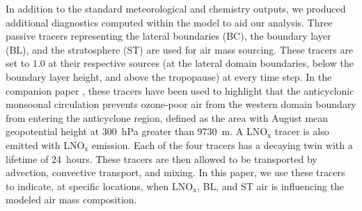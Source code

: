 In addition to the standard meteorological and chemistry outputs, we produced additional
diagnostics computed within the model to aid our analysis.
Three passive tracers representing the lateral boundaries (BC), the boundary layer (BL), and the
stratosphere (ST) are used for air mass sourcing. These tracers are set to $1.0$ at their respective
sources (at the lateral domain boundaries, below the boundary layer height, and above
the tropopause) at every time step. In the companion paper \citep{Wong:2014xx}, these
tracers have been used to highlight that the anticyclonic monsoonal circulation prevents
ozone-poor air from the western domain boundary from entering the anticyclone region,
defined as the area with August mean geopotential height at 300~hPa greater than  9730~m.
A LNO$_\mathrm{x}$ tracer is also emitted with LNO$_\mathrm{x}$ emission. Each of the four tracers has a
decaying twin with a lifetime of 24~hours. These tracers are then allowed to be
transported by advection, convective transport, and mixing. In this paper, we use these
tracers to indicate, at specific locations, when $\mathrm{LNO_x}$, BL, and ST air
is influencing the modeled air mass composition.

